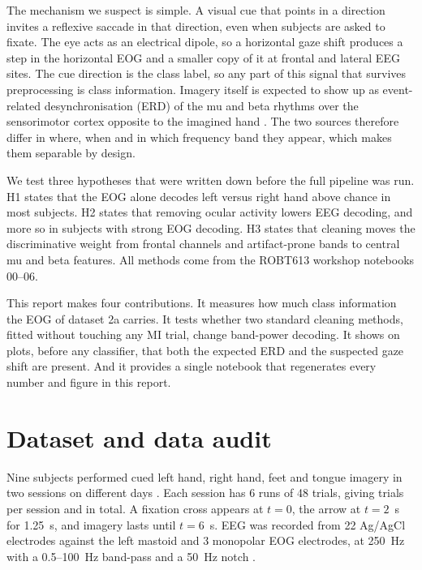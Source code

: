 \documentclass[conference]{IEEEtran}
\begin{document}
The mechanism we suspect is simple. A visual cue that points in a direction invites a reflexive saccade in that direction, even when subjects are asked to fixate. The eye acts as an electrical dipole, so a horizontal gaze shift produces a step in the horizontal EOG and a smaller copy of it at frontal and lateral EEG sites. The cue direction is the class label, so any part of this signal that survives preprocessing is class information. Imagery itself is expected to show up as event-related desynchronisation (ERD) of the mu and beta rhythms over the sensorimotor cortex opposite to the imagined hand \cite{pfurtscheller1999}. The two sources therefore differ in where, when and in which frequency band they appear, which makes them separable by design.

We test three hypotheses that were written down before the full pipeline was run. H1 states that the EOG alone decodes left versus right hand above chance in most subjects. H2 states that removing ocular activity lowers EEG decoding, and more so in subjects with strong EOG decoding. H3 states that cleaning moves the discriminative weight from frontal channels and artifact-prone bands to central mu and beta features. All methods come from the ROBT613 workshop notebooks 00--06.

This report makes four contributions. It measures how much class information the EOG of dataset 2a carries. It tests whether two standard cleaning methods, fitted without touching any MI trial, change band-power decoding. It shows on plots, before any classifier, that both the expected ERD and the suspected gaze shift are present. And it provides a single notebook that regenerates every number and figure in this report.

\section{Dataset and data audit}
Nine subjects performed cued left hand, right hand, feet and tongue imagery in two sessions on different days \cite{brunner2008}. Each session has 6 runs of 48 trials, giving \NTrialsSession{} trials per session and \NTrialsTotal{} in total. A fixation cross appears at $t=0$, the arrow at $t=2$~s for 1.25~s, and imagery lasts until $t=6$~s. EEG was recorded from 22 Ag/AgCl electrodes against the left mastoid and 3 monopolar EOG electrodes, at 250~Hz with a 0.5--100~Hz band-pass and a 50~Hz notch \cite{brunner2008}.
\end{document}
